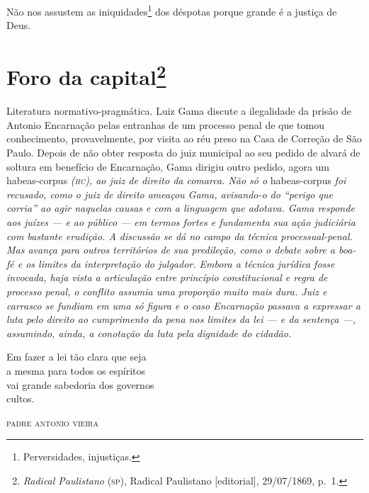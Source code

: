 Não nos assustem as iniquidades\footnote{Perversidades, injustiças.}
dos déspotas porque grande é a justiça de Deus.

\chapter{Foro da capital\footnote{\emph{Radical Paulistano} (\textsc{sp}), Radical Paulistano {[}editorial{]},
  29/07/1869, p.~1.}}

\begin{didascalia}
Literatura normativo-pragmática. Luiz Gama discute a ilegalidade da
prisão de Antonio Encarnação pelas entranhas de um processo penal de que
tomou conhecimento, provavelmente, por visita ao réu preso na Casa de
Correção de São Paulo. Depois de não obter resposta do juiz municipal ao
seu pedido de alvará de soltura em benefício de Encarnação, Gama dirigiu
outro pedido, agora um habeas-corpus \emph{(\textsc{hc}), ao juiz de direito da
comarca. Não só o} habeas-corpus \emph{foi recusado, como o juiz de
direito ameaçou Gama, avisando-o do ``perigo que corria'' ao agir
naquelas causas e com a linguagem que adotava. Gama responde aos juízes
--- e ao público --- em termos fortes e fundamenta sua ação judiciária com
bastante erudição. A discussão se dá no campo da técnica
processual-penal. Mas avança para outros territórios de sua predileção,
como o debate sobre a boa-fé e os limites da interpretação do julgador.
Embora a técnica jurídica fosse invocada, haja vista a articulação entre
princípio constitucional e regra de processo penal, o conflito assumia
uma proporção muito mais dura. Juiz e carrasco se fundiam em uma só
figura e o caso Encarnação passava a expressar a luta pelo direito ao
cumprimento da pena nos limites da lei --- e da sentença ---, assumindo,
ainda, a conotação da luta pela dignidade do cidadão.}
\end{didascalia}


\epigraph{Em fazer a lei tão clara que seja\\
a mesma para todos os espíritos\\
vai grande sabedoria dos governos\\
cultos.}{\textsc{padre antonio vieira}\footnotemark}

